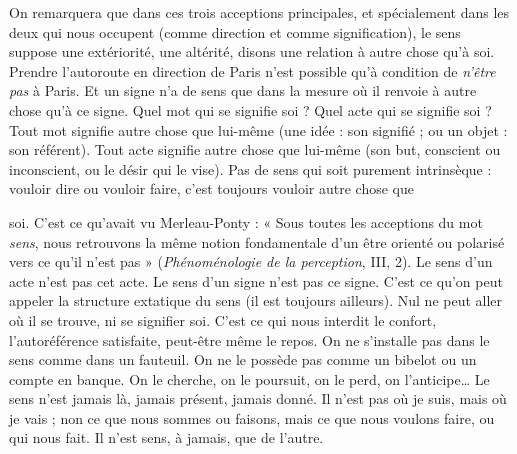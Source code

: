 On remarquera que dans ces trois acceptions principales, et spécialement
dans les deux qui nous occupent (comme direction et comme signification), le
sens suppose une extériorité, une altérité, disons une relation à autre chose qu’à
soi. Prendre l’autoroute en direction de Paris n’est possible qu’à condition de
{\it n'être pas} à Paris. Et un signe n’a de sens que dans la mesure où il renvoie à
autre chose qu’à ce signe. Quel mot qui se signifie soi ? Quel acte qui se signifie
soi ? Tout mot signifie autre chose que lui-même (une idée : son signifié ; ou
un objet : son référent). Tout acte signifie autre chose que lui-même (son but,
conscient ou inconscient, ou le désir qui le vise). Pas de sens qui soit purement
intrinsèque : vouloir dire ou vouloir faire, c’est toujours vouloir autre chose que

soi. C’est ce qu'avait vu Merleau-Ponty : « Sous toutes les acceptions du mot
{\it sens}, nous retrouvons la même notion fondamentale d’un être orienté ou polarisé
vers ce qu'il n’est pas » ({\it Phénoménologie de la perception}, III, 2). Le sens
d’un acte n’est pas cet acte. Le sens d’un signe n’est pas ce signe. C’est ce qu’on
peut appeler la structure extatique du sens (il est toujours ailleurs). Nul ne peut
aller où il se trouve, ni se signifier soi. C’est ce qui nous interdit le confort,
l’autoréférence satisfaite, peut-être même le repos. On ne s’installe pas dans le
sens comme dans un fauteuil. On ne le possède pas comme un bibelot ou un
compte en banque. On le cherche, on le poursuit, on le perd, on l’anticipe…
Le sens n’est jamais là, jamais présent, jamais donné. Il n’est pas où je suis, mais
où je vais ; non ce que nous sommes ou faisons, mais ce que nous voulons faire,
ou qui nous fait. Il n’est sens, à jamais, que de l’autre.

